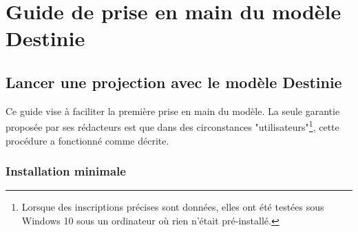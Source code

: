 \section{Guide de prise en main du modèle Destinie}
\subsection{Lancer une projection avec le modèle Destinie}
Ce guide vise à faciliter la première prise en main du modèle. La seule garantie proposée par ses rédacteurs est que dans des circonstances "utilisateurs"\footnote{Lorsque des inscriptions précises sont données, elles ont été testées sous Windows 10  sous un ordinateur où rien n'était pré-installé.}, cette procédure a fonctionné comme décrite.\\
\subsubsection{Installation minimale}
